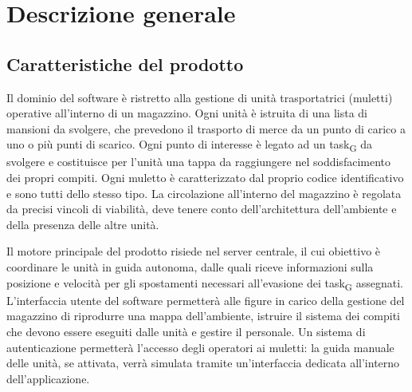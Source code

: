 \section{Descrizione generale}


\subsection{Caratteristiche del prodotto}
Il dominio del software è ristretto alla gestione di unità trasportatrici (muletti) operative all’interno di un magazzino. Ogni unità è istruita di una lista di mansioni da svolgere, che prevedono il trasporto di merce da un punto di carico a uno o più punti di scarico. Ogni punto di interesse è legato ad un task\textsubscript{G} da svolgere e costituisce per l’unità una tappa da raggiungere nel soddisfacimento dei propri compiti. Ogni muletto è caratterizzato dal proprio codice identificativo e sono tutti dello stesso tipo.
La circolazione all’interno del magazzino è regolata da precisi vincoli di viabilità, deve tenere conto dell’architettura dell’ambiente e della presenza delle altre unità.

Il motore principale del prodotto risiede nel server centrale, il cui obiettivo è coordinare le unità in guida autonoma, dalle quali riceve informazioni sulla posizione e velocità per gli spostamenti necessari all’evasione dei task\textsubscript{G} assegnati. L’interfaccia utente del software permetterà alle figure in carico della gestione del magazzino di riprodurre una mappa dell’ambiente, istruire il sistema dei compiti che devono essere eseguiti dalle unità e gestire il personale. Un sistema di autenticazione permetterà l’accesso degli operatori ai muletti: la guida manuale delle unità, se attivata, verrà simulata tramite un’interfaccia dedicata all’interno dell’applicazione.

